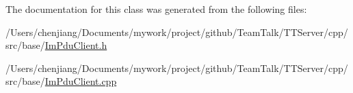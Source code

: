 The documentation for this class was generated from the following files\+:\begin{DoxyCompactItemize}
\item 
/\+Users/chenjiang/\+Documents/mywork/project/github/\+Team\+Talk/\+T\+T\+Server/cpp/src/base/\hyperlink{_im_pdu_client_8h}{Im\+Pdu\+Client.\+h}\item 
/\+Users/chenjiang/\+Documents/mywork/project/github/\+Team\+Talk/\+T\+T\+Server/cpp/src/base/\hyperlink{_im_pdu_client_8cpp}{Im\+Pdu\+Client.\+cpp}\end{DoxyCompactItemize}
